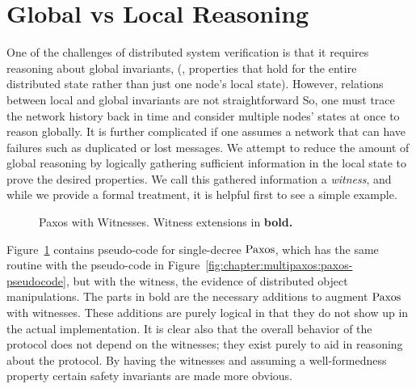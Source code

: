 \section{Global vs Local Reasoning}
\label{chapter:witnesspassing:sec:global-local-reasoning}


One of the challenges of distributed system verification is that it requires reasoning about
global invariants, (\ie, properties that hold for the entire distributed state rather than just
one node's local state).
However, relations between local and global invariants are not straightforward 
So,  one must trace the network history back in time and consider multiple
nodes' states at once to reason globally.
It is further complicated if one assumes a network that can have failures such as duplicated
or lost messages.
We attempt to reduce the amount of global reasoning by logically gathering sufficient
information in the local state to prove the desired properties.
We call this gathered information a \textit{witness}, and while we provide a formal treatment, it is helpful first to see a simple example.


\begin{figure}
\begin{minipage}{\linewidth}
\noindent
\begin{multicols}{2}
  
\end{multicols}
\end{minipage}
\caption{Paxos with Witnesses. Witness extensions in \bfseries{bold}.}
\label{fig:chapter:witnesspassing:paxos-witness}
\end{figure}

Figure~\ref{fig:chapter:witnesspassing:paxos-witness} contains pseudo-code for single-decree $\mathrm{Paxos}$,
which has the same routine with the pseudo-code in Figure~\ref{fig:chapter:multipaxos:paxos-pseudocode},
but with the witness, the evidence of distributed object manipulations.
The parts in bold are the necessary additions to augment $\mathrm{Paxos}$ with witnesses.
These additions are purely logical in that they do not show up in the actual implementation.
It is clear also that the overall behavior of the protocol does not depend on the witnesses;
they exist purely to aid in reasoning about the protocol.
By having the witnesses and assuming a well-formedness property certain safety invariants are
made more obvious.

